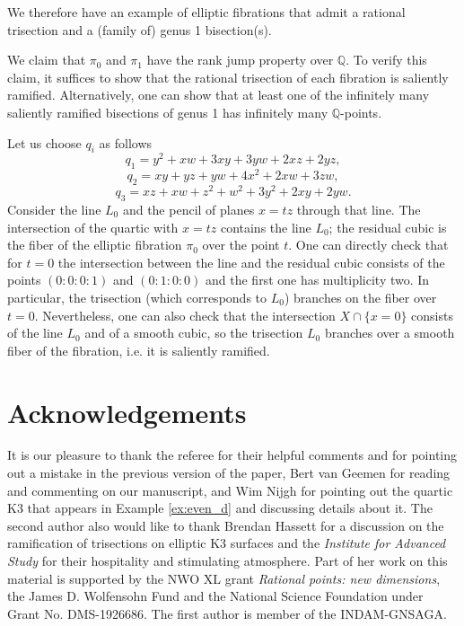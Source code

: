 \documentclass{amsart}
\theoremstyle{definition}
\numberwithin{equation}{section}
\begin{document}
We therefore have an example of elliptic fibrations that admit a rational trisection and a (family of) genus 1 bisection(s). 

We claim that $\pi_0$ and $\pi_1$ have the rank jump property over $\mathbb{Q}$. To verify this claim, it suffices to show that the rational trisection of each fibration is saliently ramified. Alternatively, one can show that at least one of the infinitely many saliently ramified bisections of genus 1 has infinitely many $\mathbb{Q}$-points.


Let us choose $q_i$ as follows
 $$q_1 = y^2 +xw+3xy +3yw +2xz+2yz,$$
$$q_2 = xy +yz +yw+4x^2+2xw+3zw,$$
$$q_3= xz +xw+z^2 +w^2 +3y^2 +2xy+2yw.$$
Consider the line $L_0$ and the pencil of planes $x=tz$ through that line. 
The intersection of the quartic with $x=tz$ contains the line $L_0$; the residual cubic is the fiber of the elliptic fibration $\pi_0$ over the point $t$. One can directly check that for $t=0$ the intersection between the line and the residual cubic consists of the points $(0:0:0:1)$ and $(0:1:0:0)$ and the first one has multiplicity two. In particular, the trisection (which corresponds to $L_0$) branches on the fiber over $t=0$. Nevertheless, one can also check that the intersection $X\cap \{x=0\}$ consists of the line $L_0$ and of a smooth cubic, so the trisection $L_0$ branches over a smooth fiber of the fibration, i.e. it is saliently ramified.

\section*{Acknowledgements}
It is our pleasure to thank the referee for their helpful comments and for pointing out a mistake in the previous version of the paper, Bert van Geemen for reading and commenting on our manuscript, and Wim Nijgh for pointing out the quartic K3 that appears in Example \ref{ex:even_d} and discussing details about it.
The second author also would like to thank Brendan Hassett for a discussion on the ramification of trisections on elliptic K3 surfaces and the \textit{Institute for Advanced Study} for their hospitality and stimulating atmosphere. Part of her work on this material is supported by the NWO XL grant \textit{Rational points: new dimensions}, the James D. Wolfensohn Fund and the National Science Foundation under Grant No. DMS-1926686. The first author is member of the INDAM-GNSAGA.
\end{document}
